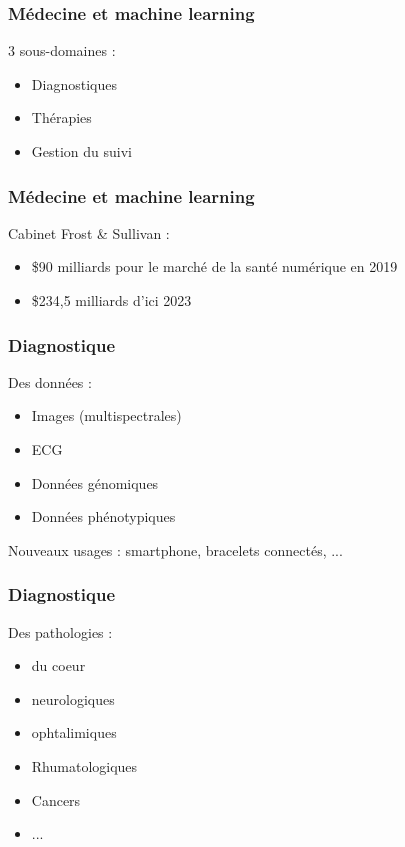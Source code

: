 \begin{frame}
  \frametitle{Médecine et machine learning}
  3 sous-domaines :
  \begin{itemize}
  \item Diagnostiques
  \item Thérapies
  \item Gestion du suivi
  \end{itemize}
\end{frame}

\begin{frame}
  \frametitle{Médecine et machine learning}
  Cabinet Frost & Sullivan :
  \begin{itemize}
    \item \$90 milliards pour le marché de la santé numérique en 2019
    \item \$234,5 milliards d’ici 2023
  \end{itemize}
\end{frame}

\begin{frame}
  \frametitle{Diagnostique}
  Des données :
  \begin{itemize}
    \item Images (multispectrales)
    \item ECG
    \item Données génomiques 
    \item Données phénotypiques
  \end{itemize}
\end{frame}
Nouveaux usages : smartphone, bracelets connectés, ...

\begin{frame}
  \frametitle{Diagnostique}
  Des pathologies :
  \begin{itemize}
    \item du coeur
    \item neurologiques
    \item ophtalimiques
    \item Rhumatologiques
    \item Cancers
    \item ...
  \end{itemize}
\end{frame}

